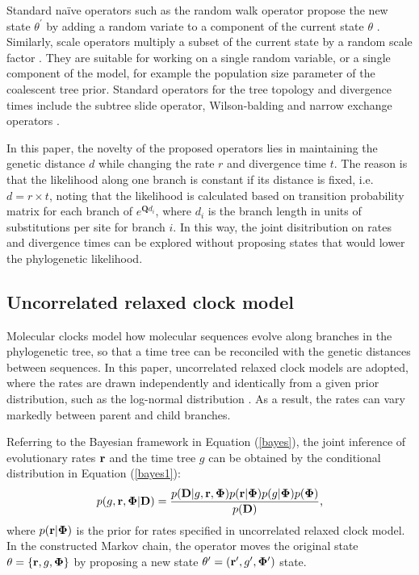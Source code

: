 \documentclass{bmcart}
\begin{document}
Standard na\"{i}ve operators such as the random walk operator propose the new state $\theta^\prime$ by adding a random variate to a component of the current state $\theta$ \cite{suchard2005stochastic}. Similarly, scale operators multiply a subset of the current state by a random scale factor \cite{higuchi1997monte}. They are suitable for working on a single random variable, or a single component of the model, for example the population size parameter of the coalescent tree prior. Standard operators for the tree topology and divergence times include the subtree slide operator, Wilson-balding and narrow exchange operators \cite{drummond2002estimatingdata,hohna2008clock}.

In this paper, the novelty of the proposed operators lies in maintaining the genetic distance $d$ while changing the rate $r$ and divergence time $t$. The reason is that the likelihood along one branch is constant if its distance is fixed, i.e. $d = r \times t$, noting that the likelihood is calculated based on transition probability matrix for each branch of ${e^{\textbf{Q}d_i}}$, where $d_i$ is the branch length in units of substitutions per site for branch $i$. In this way, the joint disitribution on rates and divergence times can be explored without proposing states that would lower the phylogenetic likelihood.

\subsection*{Uncorrelated relaxed clock model}
Molecular clocks model how molecular sequences evolve along branches in the phylogenetic tree, so that a time tree can be reconciled with the genetic distances between sequences. In this paper, uncorrelated relaxed clock models are adopted, where the rates are drawn independently and identically from a given prior distribution, such as the log-normal distribution \cite{drummond2006relaxed}. As a result, the rates can vary markedly between parent and child branches.

Referring to the Bayesian framework in Equation (\ref{bayes}), the joint inference of evolutionary rates ${\bf{r}}$ and the time tree $g$ can be obtained by the conditional distribution in Equation (\ref{bayes1}):
\begin{equation}\label{bayes1}
p(g,{\bf{r}},{\bf{\Phi}} |{\bf{D}}) = \frac{{p({\bf{D}}|g,{\bf{r}},{\bf{\Phi}} )p({\bf{r}}|{\bf{\Phi}} )p(g|{\bf{\Phi}} )p({\bf{\Phi}} )}}{{p({\bf{D}})}} \text{,}
\end{equation}
where $p({\bf{r}}|{\bf{\Phi}} )$ is the prior for rates specified in uncorrelated relaxed clock model. In the constructed Markov chain, the operator moves the original state $\theta =  \{ {\bf{r}},g,{\bf{\Phi}}\}$ by proposing a new state ${\theta^\prime} = ({\bf{r}^\prime},g^\prime,{\bf{\Phi}^\prime})$ state.
\end{document}
